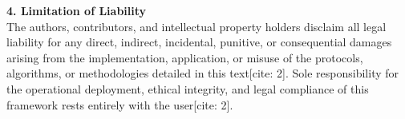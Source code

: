     \vspace{0.8em}
    \noindent
    \textbf{4. Limitation of Liability}\\
    The authors, contributors, and intellectual property holders disclaim all legal liability for any direct, indirect, incidental, punitive, or consequential damages arising from the implementation, application, or misuse of the protocols, algorithms, or methodologies detailed in this text[cite: 2]. Sole responsibility for the operational deployment, ethical integrity, and legal compliance of this framework rests entirely with the user[cite: 2].
\fi
